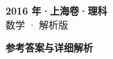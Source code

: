 \documentclass[zihao=-4, a4paper]{ctexart}
\begin{document}
\begin{center}
  {\Large\bfseries 2016 年·上海卷·理科}\\[4pt]
  {\large 数学 · 解析版}
\end{center}
\medskip
{}

\clearpage
{}
\begin{center}{\Large\bfseries 参考答案与详细解析}\end{center}
\medskip

\end{document}
